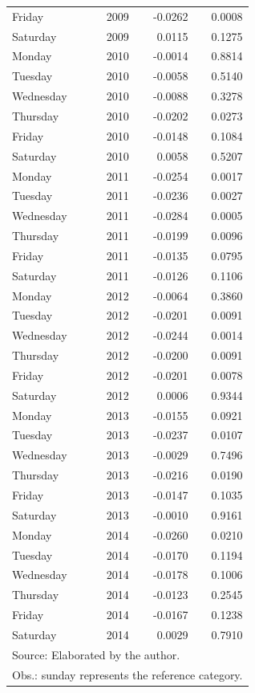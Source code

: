 \documentclass[12pt,openright,oneside,a4paper,english,french,spanish]{abntex2}
\numberwithin{table}{section} %
\numberwithin{figure}{section} %
\begin{document}
\begin{otherlanguage}{english}
\begin{table}[H]
\begin{center}
\begin{tiny}
\begin{tabular}{lrrr}
  Friday &  2009 & -0.0262 & 0.0008 \\ 
  Saturday &  2009 & 0.0115 & 0.1275 \\ 
  Monday &  2010 & -0.0014 & 0.8814 \\ 
  Tuesday &  2010 & -0.0058 & 0.5140 \\ 
  Wednesday &  2010 & -0.0088 & 0.3278 \\ 
  Thursday &  2010 & -0.0202 & 0.0273 \\ 
  Friday &  2010 & -0.0148 & 0.1084 \\ 
  Saturday &  2010 & 0.0058 & 0.5207 \\ 
  Monday &  2011 & -0.0254 & 0.0017 \\ 
  Tuesday &  2011 & -0.0236 & 0.0027 \\ 
  Wednesday &  2011 & -0.0284 & 0.0005 \\ 
  Thursday &  2011 & -0.0199 & 0.0096 \\ 
  Friday &  2011 & -0.0135 & 0.0795 \\ 
  Saturday &  2011 & -0.0126 & 0.1106 \\ 
  Monday &  2012 & -0.0064 & 0.3860 \\ 
  Tuesday &  2012 & -0.0201 & 0.0091 \\ 
  Wednesday &  2012 & -0.0244 & 0.0014 \\ 
  Thursday &  2012 & -0.0200 & 0.0091 \\ 
  Friday &  2012 & -0.0201 & 0.0078 \\ 
  Saturday &  2012 & 0.0006 & 0.9344 \\ 
  Monday &  2013 & -0.0155 & 0.0921 \\ 
  Tuesday &  2013 & -0.0237 & 0.0107 \\ 
  Wednesday &  2013 & -0.0029 & 0.7496 \\ 
  Thursday &  2013 & -0.0216 & 0.0190 \\ 
  Friday &  2013 & -0.0147 & 0.1035 \\ 
  Saturday &  2013 & -0.0010 & 0.9161 \\ 
  Monday &  2014 & -0.0260 & 0.0210 \\ 
  Tuesday &  2014 & -0.0170 & 0.1194 \\ 
  Wednesday &  2014 & -0.0178 & 0.1006 \\ 
  Thursday &  2014 & -0.0123 & 0.2545 \\ 
  Friday &  2014 & -0.0167 & 0.1238 \\ 
  Saturday &  2014 & 0.0029 & 0.7910 \\
   \hline
\multicolumn{4}{l}{Source: Elaborated by the author.} \\ 
\multicolumn{4}{l}{Obs.: sunday represents the reference category.}
\end{tabular}
\end{tiny}
\end{center}
\label{tab:resultados_efeito_dia_semana_saida}
\end{table}


\end{otherlanguage}
\end{document}
